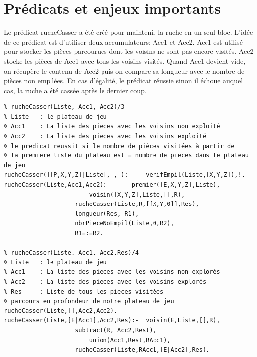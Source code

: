 \documentclass[a4paper,10pt]{article}
\begin{document}
\section{Prédicats et enjeux importants}
Le prédicat rucheCasser a été créé pour maintenir la ruche en un seul bloc.
L'idée de ce prédicat est d'utiliser 
deux accumulateurs: Acc1 et Acc2. Acc1 est utilisé pour stocker les pièces
parcourues dont les voisins ne sont pas encore visités.
 Acc2 stocke les pièces de Acc1 avec tous les voisins visités. Quand Acc1
devient vide, on récupère le contenu de Acc2 puis on compare
sa longueur avec le nombre de pièces non empilées. En cas d'égalité, le
prédicat réussie sinon il échoue auquel cas, la ruche a été cassée après le
dernier coup.
\begin{verbatim}
% rucheCasser(Liste, Acc1, Acc2)/3
% Liste   : le plateau de jeu
% Acc1    : La liste des pieces avec les voisins non exploité
% Acc2    : La liste des pieces avec les voisins exploité
% le predicat reussit si le nombre de pièces visitées à partir de
% la premiére liste du plateau est = nombre de pieces dans le plateau de jeu								
rucheCasser([[P,X,Y,Z]|Liste],_,_):-	verifEmpil(Liste,[X,Y,Z]),!.
rucheCasser(Liste,Acc1,Acc2):-  	premier([E,X,Y,Z],Liste),
				    	voisin([X,Y,Z],Liste,[],R),																	  	
					rucheCasser(Liste,R,[[X,Y,0]],Res),
					longueur(Res, R1),
					nbrPieceNoEmpil(Liste,0,R2),		  	
					R1=:=R2.
									  									  								  	
% rucheCasser(Liste, Acc1, Acc2,Res)/4
% Liste   : le plateau de jeu
% Acc1    : La liste des pieces avec les voisins non explorés
% Acc2    : La liste des pieces avec les voisins explorés
% Res	  : Liste de tous les pieces visitées
% parcours en profondeur de notre plateau de jeu
rucheCasser(Liste,[],Acc2,Acc2).		
rucheCasser(Liste,[E|Acc1],Acc2,Res):- 	voisin(E,Liste,[],R),
			 		subtract(R, Acc2,Rest),										
			         	union(Acc1,Rest,RAcc1),
				   	rucheCasser(Liste,RAcc1,[E|Acc2],Res).
\end{verbatim}
\end{document}

